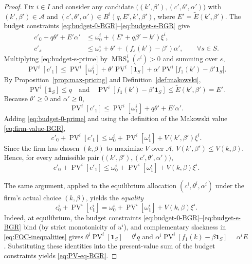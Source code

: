 \documentclass[11pt,a4paper,oneside]{book}
\def\1{\mathbf{1}}
\def\leq{\leqslant}
\def\geq{\geqslant}
\def\et{\quad \text{and} \quad}
\DeclareMathOperator{\MRS}{MRS}
\DeclareMathOperator{\PV}{PV}
\theoremstyle{plain}
\theoremstyle{definition}
\theoremstyle{remark}
\numberwithin{equation}{chapter}
\begin{document}
\begin{proof}
Fix $i \in I$ and consider any candidate $\bigl( (k', \beta'), (c', \theta', \alpha') \bigr)$ with $(k', \beta') \in \mathcal{A}$ and $(c', \theta', \alpha') \in B^i(q, E', k', \beta')$, where $E' = \widetilde{E}(k', \beta')$.
The budget constraints \eqref{eq:budget-0-BGR}--\eqref{eq:budget-s-BGR} give
\begin{align}
  c'_0 + q \theta' + E' \alpha'
  &\leq
  \omega^i_0 + (E' + q \beta' - k') \xi^i,
  \label{eq:budget-0-prime}\\
  c'_s
  &\leq
  \omega^i_s + \theta' + (f_s(k') - \beta') \alpha',
  \qquad \forall s \in S.
  \label{eq:budget-s-prime}
\end{align}
Multiplying \eqref{eq:budget-s-prime} by $\MRS^i_s(c^i) > 0$ and summing over $s$,
\begin{equation*}
  \PV^i[c'_1]
  \leq
  \PV^i[\omega^i_1] + \theta' \PV^i[\1_S] + \alpha' \PV^i\bigl[ f_1(k') - \beta' \1_S \bigr].
\end{equation*}
By Proposition~\ref{prop:max-pricing} and Definition~\ref{def:makowski},
\begin{equation*}
  \PV^i[\1_S] \leq q
  \et
  \PV^i[f_1(k') - \beta' \1_S] \leq \widetilde{E}(k', \beta') = E'.
\end{equation*}
Because $\theta' \geq 0$ and $\alpha' \geq 0$,
\begin{equation*}
  \PV^i[c'_1]
  \leq
  \PV^i[\omega^i_1] + q \theta' + E' \alpha'.
\end{equation*}
Adding \eqref{eq:budget-0-prime} and using the definition of the Makowski value \eqref{eq:firm-value-BGR},
\begin{equation}\label{eq:PV-bound-prime}
  c'_0 + \PV^i[c'_1]
  \leq
  \omega^i_0 + \PV^i[\omega^i_1] + V(k', \beta') \xi^i.
\end{equation}
Since the firm has chosen $(k, \beta)$ to maximize $V$ over $\mathcal{A}$, $V(k', \beta') \leq V(k, \beta)$.
Hence, for every admissible pair $\bigl( (k', \beta'), (c', \theta', \alpha') \bigr)$,
\begin{equation}\label{eq:PV-bound}
  c'_0 + \PV^i[c'_1]
  \leq
  \omega^i_0 + \PV^i[\omega^i_1] + V(k, \beta) \xi^i.
\end{equation}

The same argument, applied to the equilibrium allocation $(c^i, \theta^i, \alpha^i)$ under the firm's actual choice $(k, \beta)$, yields the \emph{equality}
\begin{equation}\label{eq:PV-eq-BGR}
  c^i_0 + \PV^i[c^i_1]
  =
  \omega^i_0 + \PV^i[\omega^i_1] + V(k, \beta) \xi^i.
\end{equation}
Indeed, at equilibrium, the budget constraints \eqref{eq:budget-0-BGR}--\eqref{eq:budget-s-BGR} bind (by strict monotonicity of $u^i$), and complementary slackness in \eqref{eq:FOC-inequalities} gives $\theta^i \PV^i[\1_S] = \theta^i q$ and $\alpha^i \PV^i[f_1(k) - \beta \1_S] = \alpha^i E$.
Substituting these identities into the present-value sum of the budget constraints yields \eqref{eq:PV-eq-BGR}.


\end{proof}
\end{document}
